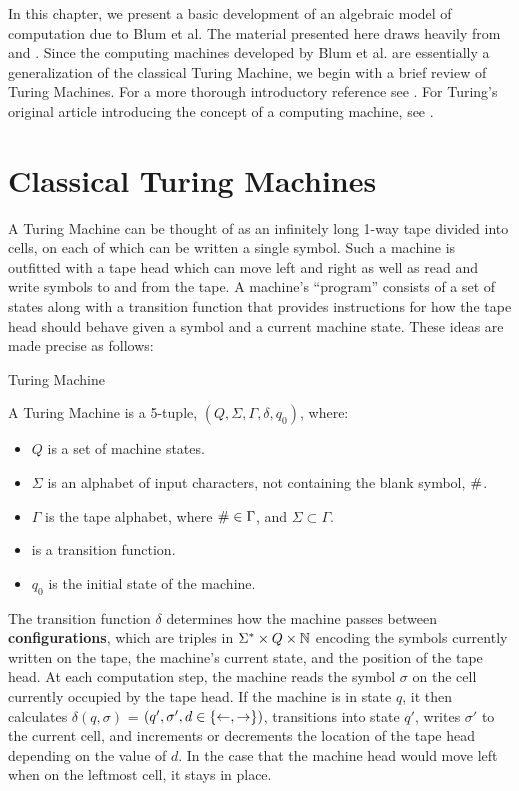 In this chapter, we present a basic development of an algebraic model
of computation due to Blum et al.  The material presented here draws
heavily from \cite{B89} and \cite{B98}.  Since the computing machines
developed by Blum et al. are essentially a generalization of the
classical Turing Machine, we begin with a brief review of Turing
Machines.  For a more thorough introductory reference see \cite{S06}.
For Turing's original article introducing the concept of a computing
machine, see \cite{T36}.

\section{Classical Turing Machines}

A Turing Machine can be thought of as an infinitely long 1-way tape
divided into cells, on each of which can be written a single symbol.
Such a machine is outfitted with a tape head which can move left and
right as well as read and write symbols to and from the tape. A
machine's ``program'' consists of a set of states along with a
transition function that provides instructions for how the tape head
should behave given a symbol and a current machine state.  These ideas
are made precise as follows:

\begin{definition}{Turing Machine}

  A Turing Machine is a 5-tuple, $(Q, \Sigma, \Gamma, \delta, q_0)$, where:

  \begin{itemize}
  \item $Q$ is a set of machine states.
  \item $\Sigma$ is an alphabet of input characters, not containing
    the blank symbol, $\#$.
  \item $\Gamma$ is the tape alphabet, where $\# \in \Gamma$, and
    $\Sigma \subset \Gamma$.
  \item {} is a transition function.
  \item $q_0$ is the initial state of the machine.
  \end{itemize}

  The transition function $\delta$ determines how the machine passes
  between \textbf{configurations}, which are triples in $\Sigma^*
  \times Q \times \mathbb{N}$ encoding the symbols currently written on
  the tape, the machine's current state, and the position of the tape
  head.  At each computation step, the machine reads the symbol
  $\sigma$ on the cell currently occupied by the tape head.  If the
  machine is in state $q$, it then calculates $\delta(q, \sigma)$ =
  $(q', \sigma', d \in \{\leftarrow, \rightarrow\})$, transitions
  into state $q'$, writes $\sigma'$ to the current cell, and
  increments or decrements the location of the tape head depending on
  the value of $d$.  In the case that the machine head would move left
  when on the leftmost cell, it stays in place.
\end{definition}

